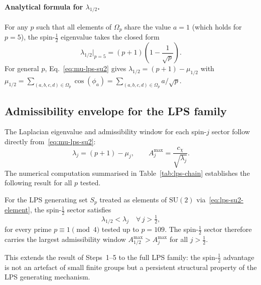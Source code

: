     \paragraph{Analytical formula for $\lambda_{1/2}$.}
      For any $p$ such that all elements of $\Omega_p$ share the value $a = 1$
      (which holds for $p = 5$), the spin-$\tfrac{1}{2}$ eigenvalue takes the
      closed form
    \begin{equation}
      \lambda_{1/2}\big|_{p=5}
      = (p+1)\!\left(1 - \frac{1}{\sqrt{p}}\right).
      \label{eq:lambda-half-p5}
      \end{equation}
      For general $p$, Eq.~\eqref{eq:mu-lps-su2} gives
      $\lambda_{1/2} = (p+1) - \mu_{1/2}$ with
      $\mu_{1/2} = \sum_{(a,b,c,d)\in\Omega_p} \cos(\phi_a)
      = \sum_{(a,b,c,d)\in\Omega_p} a/\sqrt{p}$.

\subsection{Admissibility envelope for the LPS family}
  \label{sec:step6c}

  The Laplacian eigenvalue and admissibility window for each spin-$j$ sector
  follow directly from~\eqref{eq:mu-lps-su2}:
  \begin{equation}
    \lambda_j = (p+1) - \mu_j,
    \qquad
    A^{\max}_j = \frac{c_\chi}{\sqrt{\lambda_j}}.
    \label{eq:Amax-lps}
  \end{equation}
  The numerical computation summarised in Table~\ref{tab:lps-chain} establishes
  the following result for all $p$ tested.

  \begin{proposition}
    \label{prop:lps-hierarchy}
    For the LPS generating set $S_p$ treated as elements of $\mathrm{SU}(2)$
    via~\eqref{eq:lps-su2-element}, the spin-$\tfrac{1}{2}$ sector satisfies
    \begin{equation}
      \lambda_{1/2} < \lambda_j \quad \forall\, j > \tfrac{1}{2},
      \label{eq:lps-ordering}
    \end{equation}
    for every prime $p \equiv 1 \pmod{4}$ tested up to $p = 109$.
    The spin-$\tfrac{1}{2}$ sector therefore carries the largest admissibility
    window $A^{\max}_{1/2} > A^{\max}_j$ for all $j > \tfrac{1}{2}$.
  \end{proposition}

  \noindent
  This extends the result of Steps~1--5 to the full LPS family:
  the spin-$\tfrac{1}{2}$ advantage is not an artefact of small finite groups
  but a persistent structural property of the LPS generating mechanism.

